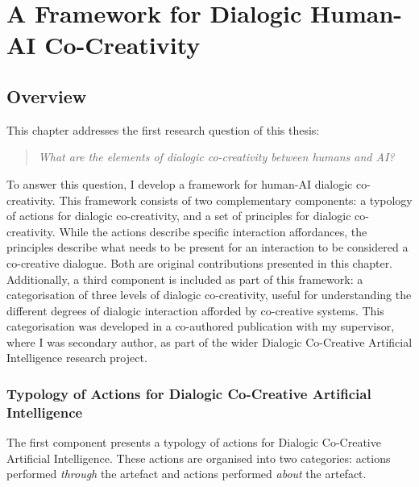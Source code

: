 \chapter{A Framework for Dialogic Human-AI Co-Creativity} \label{c:tc4}


\section{Overview}

This chapter addresses the first research question of this thesis: 
\begin{quote}
    \textit{What are the elements of dialogic co-creativity between humans and AI?}
\end{quote}
To answer this question, I develop a framework for human-AI dialogic co-creativity. This framework consists of two complementary components: a typology of actions for dialogic co-creativity, and a set of principles for dialogic co-creativity. While the actions describe specific interaction affordances, the principles describe what needs to be present for an interaction to be considered a co-creative dialogue. Both are original contributions presented in this chapter. Additionally, a third component is included as part of this framework: a categorisation of three levels of dialogic co-creativity, useful for understanding the different degrees of dialogic interaction afforded by co-creative systems. This categorisation was developed in a co-authored publication with my supervisor, where I was secondary author, as part of the wider Dialogic Co-Creative Artificial Intelligence research project.

\subsection{Typology of Actions for Dialogic Co-Creative Artificial Intelligence}

The first component presents a typology of actions for Dialogic Co-Creative Artificial Intelligence. These actions are organised into two categories: actions performed \textit{through} the artefact and actions performed \textit{about} the artefact.

